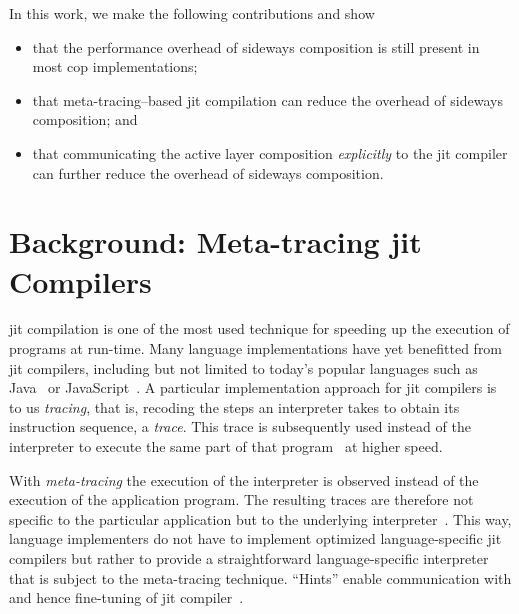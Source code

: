 \documentclass[preprint,english,10pt,nonatbib]{sigplanconf}
\begin{document}

In this work, we make the following contributions and show
\begin{itemize}
\item that the performance overhead of sideways composition is still
  present in most \ac{cop} implementations;
\item that meta-tracing--based \ac{jit} compilation can reduce the
  overhead of sideways composition; and
\item that communicating the active layer composition \emph{explicitly} to the
  \ac{jit} compiler can further reduce the overhead of sideways composition.
\end{itemize}


\section{Background: Meta-tracing \acs{jit} Compilers}

\Acf{jit} compilation is one of the most used technique for speeding up the
execution of programs at run-time. Many language implementations have yet
benefitted from \ac{jit} compilers, including but not limited to today's
popular languages such as Java~\cite{paleczny+:2001:java-hotspot} or
JavaScript~\cite{holtta:2013:crankshafting-from}. A particular implementation
approach for \ac{jit} compilers is to us \emph{tracing}, that is, recoding the
steps an interpreter takes to obtain its instruction sequence, a \emph{trace}.
This trace is subsequently used instead of the interpreter to execute the same
part of that program~\cite{mitchell:1970:design-construction} at higher speed.

With \emph{meta-tracing} the execution of the interpreter is observed instead
of the execution of the application program. The resulting traces are therefore
not specific to the particular application but to the underlying
interpreter~\cite{bolz+:2009:tracing-meta-level:}. This way, language
implementers do not have to implement optimized language-specific \ac{jit}
compilers but rather to provide a straightforward language-specific interpreter
that is subject to the meta-tracing technique. ``Hints'' enable
communication with and hence fine-tuning of \ac{jit}
compiler~\cite{bolz_runtime_2011}.
\end{document}
